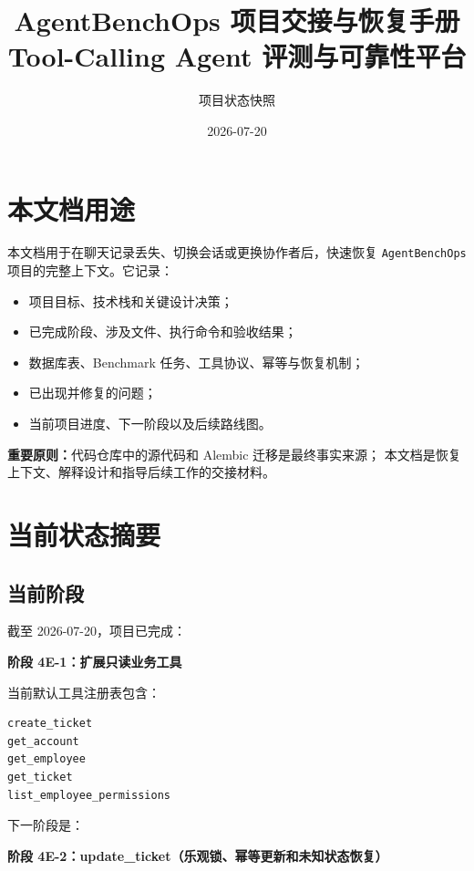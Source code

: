 \documentclass[11pt,a4paper]{ctexart}
\title{\textbf{AgentBenchOps 项目交接与恢复手册}\\
\large Tool-Calling Agent 评测与可靠性平台}
\author{项目状态快照}
\date{2026-07-20}
\begin{document}
\maketitle
\tableofcontents
\newpage

\section{本文档用途}

本文档用于在聊天记录丢失、切换会话或更换协作者后，快速恢复
\texttt{AgentBenchOps} 项目的完整上下文。它记录：

\begin{itemize}[leftmargin=2em]
  \item 项目目标、技术栈和关键设计决策；
  \item 已完成阶段、涉及文件、执行命令和验收结果；
  \item 数据库表、Benchmark 任务、工具协议、幂等与恢复机制；
  \item 已出现并修复的问题；
  \item 当前项目进度、下一阶段以及后续路线图。
\end{itemize}

\textbf{重要原则：}代码仓库中的源代码和 Alembic 迁移是最终事实来源；
本文档是恢复上下文、解释设计和指导后续工作的交接材料。

\section{当前状态摘要}

\subsection{当前阶段}

截至 2026-07-20，项目已完成：

\begin{center}
\textbf{阶段 4E-1：扩展只读业务工具}
\end{center}

当前默认工具注册表包含：

\begin{lstlisting}
create_ticket
get_account
get_employee
get_ticket
list_employee_permissions
\end{lstlisting}

下一阶段是：

\begin{center}
\textbf{阶段 4E-2：update\_ticket（乐观锁、幂等更新和未知状态恢复）}
\end{center}
\end{document}
